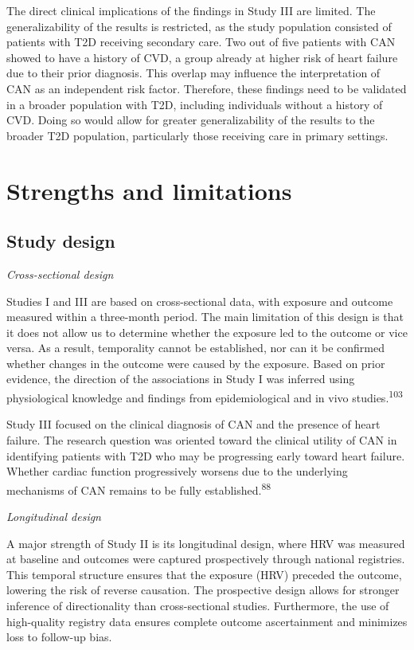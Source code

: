 \documentclass[
  a4paper,
  headsepline=true,
  open=any]{scrbook}
\begin{document}
The direct clinical implications of the findings in Study III are
limited. The generalizability of the results is restricted, as the study
population consisted of patients with T2D receiving secondary care. Two
out of five patients with CAN showed to have a history of CVD, a group
already at higher risk of heart failure due to their prior diagnosis.
This overlap may influence the interpretation of CAN as an independent
risk factor. Therefore, these findings need to be validated in a broader
population with T2D, including individuals without a history of CVD.
Doing so would allow for greater generalizability of the results to the
broader T2D population, particularly those receiving care in primary
settings.

\hypertarget{strengths-and-limitations}{%
\section{Strengths and limitations}\label{strengths-and-limitations}}

\hypertarget{study-design}{%
\subsection{Study design}\label{study-design}}

\emph{Cross-sectional design}

Studies I and III are based on cross-sectional data, with exposure and
outcome measured within a three-month period. The main limitation of
this design is that it does not allow us to determine whether the
exposure led to the outcome or vice versa. As a result, temporality
cannot be established, nor can it be confirmed whether changes in the
outcome were caused by the exposure. Based on prior evidence, the
direction of the associations in Study I was inferred using
physiological knowledge and findings from epidemiological and in vivo
studies.\textsuperscript{103}

Study III focused on the clinical diagnosis of CAN and the presence of
heart failure. The research question was oriented toward the clinical
utility of CAN in identifying patients with T2D who may be progressing
early toward heart failure. Whether cardiac function progressively
worsens due to the underlying mechanisms of CAN remains to be fully
established.\textsuperscript{88}

\emph{Longitudinal design}

A major strength of Study II is its longitudinal design, where HRV was
measured at baseline and outcomes were captured prospectively through
national registries. This temporal structure ensures that the exposure
(HRV) preceded the outcome, lowering the risk of reverse causation. The
prospective design allows for stronger inference of directionality than
cross-sectional studies. Furthermore, the use of high-quality registry
data ensures complete outcome ascertainment and minimizes loss to
follow-up bias.
\end{document}
